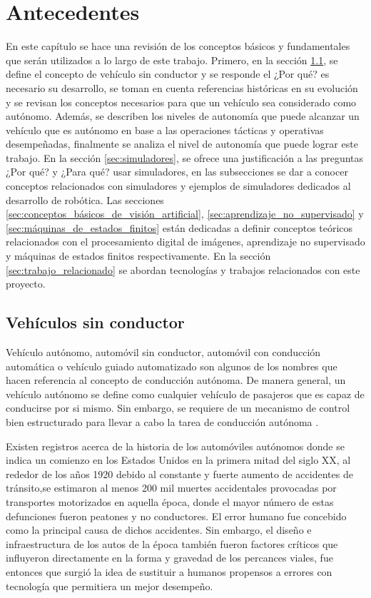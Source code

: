 \chapter{Antecedentes} \label{cap:antecedentes}
En este capítulo se hace una revisión de los conceptos básicos y fundamentales que serán utilizados a lo largo de este trabajo. Primero, en la sección \ref{sec:vehículos_sin_conductor}, se define el concepto de vehículo sin conductor y se responde el ¿Por qué? es necesario su desarrollo, se toman en cuenta referencias históricas en su evolución y se revisan los conceptos necesarios para que un vehículo sea considerado como autónomo. Además, se describen los niveles de autonomía que puede alcanzar un vehículo que es autónomo en base a las operaciones tácticas y operativas desempeñadas, finalmente se analiza el nivel de autonomía que puede lograr este trabajo. En la sección \ref{sec:simuladores}, se ofrece una justificación a las preguntas ¿Por qué? y ¿Para qué? usar simuladores, en las subsecciones se dar a conocer conceptos relacionados con simuladores y ejemplos de simuladores dedicados al desarrollo de robótica. Las secciones \ref{sec:conceptos_básicos_de_visión_artificial}, \ref{sec:aprendizaje_no_supervisado} y \ref{sec:máquinas_de_estados_finitos} están dedicadas a definir conceptos teóricos relacionados con el procesamiento digital de imágenes, aprendizaje no supervisado y máquinas de estados finitos respectivamente. En la sección \ref{sec:trabajo_relacionado} se abordan tecnologías y trabajos relacionados con este proyecto.

\section{Vehículos sin conductor} \label{sec:vehículos_sin_conductor}

Vehículo autónomo, automóvil sin conductor, automóvil con conducción automática o vehículo guiado automatizado son algunos de los nombres que hacen referencia al concepto de conducción autónoma. De manera general, un vehículo autónomo se define como cualquier vehículo de pasajeros que es capaz de conducirse por si mismo. Sin embargo, se requiere de un mecanismo de control bien estructurado para llevar a cabo la tarea de conducción autónoma \cite{rathod2013autonomous}.

Existen registros acerca de la historia de los automóviles autónomos donde se indica un comienzo en los Estados Unidos en la primera mitad del siglo XX, al rededor de los años 1920 debido al constante y fuerte aumento de accidentes de tránsito,se estimaron al menos 200 mil muertes accidentales provocadas por transportes motorizados en aquella época, donde el mayor número de estas defunciones fueron peatones y no conductores. El error humano fue concebido como la principal causa de dichos accidentes. Sin embargo, el diseño e infraestructura de los autos de la época también fueron factores críticos que influyeron directamente en la forma y gravedad de los percances viales, fue entonces que surgió la idea de sustituir a humanos propensos a errores con tecnología que permitiera un mejor desempeño.

